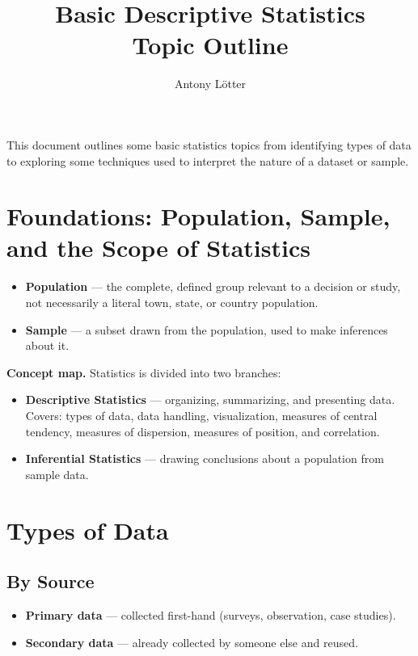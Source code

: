 \documentclass[11pt]{article}
\title{\textbf{\LARGE Basic Descriptive Statistics}\\[4pt]\large Topic Outline}
\author{Antony L\"otter}
\date{}
\begin{document}
	
	\maketitle
	\thispagestyle{empty}
	\pagestyle{empty}
	
	\vspace{-1.5em}
	\noindent This document outlines some basic statistics topics from identifying types of data to exploring some techniques used to interpret the nature of a dataset or sample.
	
	\vspace{1em}
	\tableofcontents
	\newpage
	\pagestyle{fancy}
	

	\section{Foundations: Population, Sample, and the Scope of Statistics}
	
	\begin{itemize}[leftmargin=*]
		\item \textbf{Population} --- the complete, defined group relevant to a decision or study, not necessarily a literal town, state, or country population.
		\item \textbf{Sample} --- a subset drawn from the population, used to make inferences about it.
	\end{itemize}
	
	\textbf{Concept map.} Statistics is divided into two branches:
	\begin{itemize}[leftmargin=*]
		\item \textbf{Descriptive Statistics} --- organizing, summarizing, and presenting data. Covers: types of data, data handling, visualization, measures of central tendency, measures of dispersion, measures of position, and correlation.
		\item \textbf{Inferential Statistics} --- drawing conclusions about a population from sample data.
	\end{itemize}
	
	\section{Types of Data}
	
	\subsection{By Source}
	\begin{itemize}[leftmargin=*]
		\item \textbf{Primary data} --- collected first-hand (surveys, observation, case studies).
		\item \textbf{Secondary data} --- already collected by someone else and reused.
	\end{itemize}
	
\end{document}
